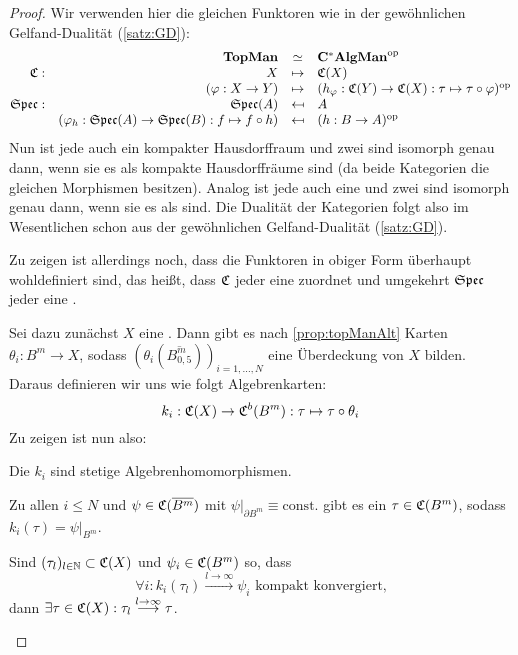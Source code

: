 \begin{proof}Wir verwenden hier die gleichen Funktoren wie in der gewöhnlichen Gelfand-Dualität (\cref{satz:GD}):
	\[\begin{array}{@{}rrcl@{}}
	 			&\KatTopMan			&\simeq		&\KatCAlgMan^\op 												\\
	\stetig: 	&X					&\mapsto	&\stetig(X)													\\
				&(\varphi:X \to Y)	&\mapsto	&(h_\varphi: \stetig(Y) \to \stetig(X): \tau \mapsto \tau \circ \varphi)^\op 		\\
	\SpecC:		&\SpecC(\A)													&\mapsfrom	&\A				\\
				&(\varphi_h: \SpecC(\A) \to \SpecC(\B): f \mapsto f \circ h)	&\mapsfrom	&(h: \B \to \A)^\op
	\end{array}\]
Nun ist jede \komTopMan{} auch ein kompakter Hausdorffraum und zwei \komenTopMan{} sind isomorph genau dann, wenn sie es als kompakte Hausdorffräume sind (da beide Kategorien die gleichen Morphismen besitzen). Analog ist jede \CAlgMan{} auch eine \CAlg{} und zwei \CAlgMann{} sind isomorph genau dann, wenn sie es als \CAlgn{} sind. Die Dualität der Kategorien folgt also im Wesentlichen schon aus der gewöhnlichen Gelfand-Dualität (\cref{satz:GD}).

Zu zeigen ist allerdings noch, dass die Funktoren in obiger Form überhaupt wohldefiniert sind, das heißt, dass $\mathfrak{C}$ jeder \komenTopMan{} eine \CAlgMan{} zuordnet und umgekehrt $\mathfrak{Spec}$ jeder \CAlgMan{} eine \komTopMan{}.

Sei dazu zunächst $X$ eine \komTopMan{}. Dann gibt es nach \cref{prop:topManAlt} Karten $\theta_i: B^m \to X$, sodass $(\theta_i(\overline{B_{0,5}^m}))_{i=1,\dots,N}$ eine Überdeckung von $X$ bilden. Daraus  definieren wir uns wie folgt Algebrenkarten:
	\[k_i: \mathfrak{C}(X) \to \mathfrak{C}^b(B^m): \tau \mapsto \tau \circ \theta_i \]
Zu zeigen ist nun also:
\begin{proofenum}
	\item \label{proof:GD2:kAlghom}
		Die $k_i$ sind stetige Algebrenhomomorphismen.
	\item \label{proof:GD2:schwachsurj}
		Zu allen $i \leq N$ und $\psi \in \mathfrak{C}(\overline{B^m})$ mit $\psi|_{\partial B^m} \equiv \mathrm{const.}$ gibt es ein $\tau \in \mathfrak{C}(B^m)$, sodass $k_i(\tau) = \psi|_{B^m}$.
	\item \label{proof:GD2:komkonv}
		Sind $(\tau_l)_{l \in \mathbb{N}} \subset \mathfrak{C}(X)$ und $\psi_i \in \mathfrak{C}(B^m)$ so, dass
			\[\forall i: k_i(\tau_l) \overset{l \to \infty}{\longrightarrow} \psi_i \text{ kompakt konvergiert,}\]
		dann $\exists \tau \in \mathfrak{C}(X): \tau_l \overset{l \to \infty}{\longrightarrow} \tau$.
	\setcounter{temp}{\value{proofenumi}}
\end{proofenum}


\end{proof}
